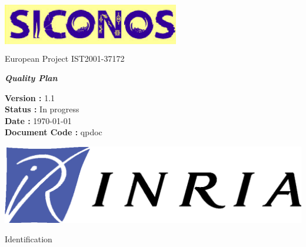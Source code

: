 \thispagestyle{empty}

\begin{center}
\includegraphics[height=23mm, width=77mm]{figure/siconos.eps}\\
\textsf{European Project  IST2001-37172}\\[6cm]
\end{center}

\begin{center}
\huge
\textsf{\textbf{\textit{Quality Plan}}}\\[2.5cm]
\end{center}

\large
\begin{center}
\textsf{\textbf{Version :} 1.1}\\
\textsf{\textbf{Status :}  In progress}\\
\textsf{\textbf{Date : } \today}\\
\textsf{\textbf{Document Code :} \acs{qpdoc}}\\[5cm]

\end{center}

\normalsize

\begin{flushright}
\includegraphics[scale=0.3]{figure/Logo-INRIA.eps}
\end{flushright}

\clearpage






\normalsize

\begin{center}
  \textsf{\Large Identification}
\end{center}

